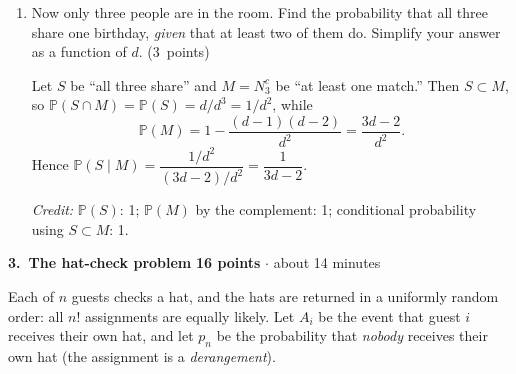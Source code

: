 \documentclass[11pt,letterpaper]{article}
\newcommand{\Prob}{\mathbb P}
\newcommand{\partpts}[1]{\unskip\nobreak\hspace{.3em}%
  \mbox{\small\color{muted}(#1 points)}}
\newcommand{\credit}[1]{\par{\footnotesize\color{muted}\textit{Credit:} #1}}
\newcommand{\problem}[4]{\par\addvspace{8pt}%
  {\large\bfseries\color{indigo}#1.\ #2}\hfill
  {\small\color{muted}\textbf{#3 points} $\cdot$ about #4 minutes}\par\nobreak}
\begin{document}
\begin{enumerate}
  \item Now only three people are in the room. Find the probability that all
  three share one birthday, \emph{given} that at least two of them do.
  Simplify your answer as a function of $d$. \partpts{3}
  \begin{solution}[1.6in]
    Let $S$ be ``all three share'' and $M=N_3^c$ be ``at least one match.''
    Then $S\subset M$, so $\Prob(S\cap M)=\Prob(S)=d/d^3=1/d^2$, while
    \[
      \Prob(M)=1-\frac{(d-1)(d-2)}{d^2}=\frac{3d-2}{d^2}.
    \]
    Hence $\Prob(S\mid M)=\dfrac{1/d^2}{(3d-2)/d^2}=\dfrac1{3d-2}$.
    \credit{$\Prob(S)$: 1; $\Prob(M)$ by the complement: 1; conditional
    probability using $S\subset M$: 1.}
  \end{solution}
\end{enumerate}

\newpage
\problem{3}{The hat-check problem}{16}{14}
Each of $n$ guests checks a hat, and the hats are returned in a uniformly
random order: all $n!$ assignments are equally likely. Let $A_i$ be the event
that guest $i$ receives their own hat, and let $p_n$ be the probability that
\emph{nobody} receives their own hat (the assignment is a \emph{derangement}).
\end{document}
